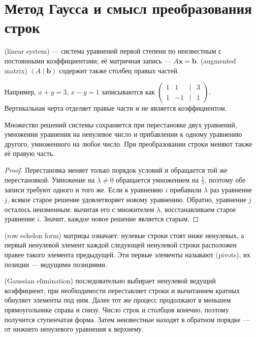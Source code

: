\section{Метод Гаусса и смысл преобразования строк}
\begin{definition}
 (linear system) — система уравнений первой степени по неизвестным с постоянными коэффициентами; её матричная запись — \(A\symbf x=\symbf b\).  (augmented matrix) \((A\mid\symbf b)\) содержит также столбец правых частей.
\end{definition}
Например, \(x+y=3\), \(x-y=1\) записываются как \(\begin{pmatrix}1&1&\mid&3\\1&-1&\mid&1\end{pmatrix}\). Вертикальная черта отделяет правые части и не является коэффициентом.

\begin{theorem}\label{thm:legacy-c18-2}
Множество решений системы сохраняется при перестановке двух уравнений, умножении уравнения на ненулевое число и прибавлении к одному уравнению другого, умноженного на любое число. При преобразовании строки меняют также её правую часть.
\end{theorem}
\begin{proof}
Перестановка меняет только порядок условий и обращается той же перестановкой. Умножение на \(\lambda\ne0\) обращается умножением на \(\frac1\lambda\), поэтому обе записи требуют одного и того же. Если к уравнению \(i\) прибавили \(\lambda\) раз уравнение \(j\), всякое старое решение удовлетворяет новому уравнению. Обратно, уравнение \(j\) осталось неизменным: вычитая его с множителем \(\lambda\), восстанавливаем старое уравнение \(i\). Значит, каждое новое решение является старым.
\end{proof}
\begin{definition}
 (row echelon form) матрицы означает: нулевые строки стоят ниже ненулевых, а первый ненулевой элемент каждой следующей ненулевой строки расположен правее такого элемента предыдущей. Эти первые элементы называют  (pivots), их позиции — ведущими позициями.
\end{definition}
 (Gaussian elimination) последовательно выбирает ненулевой ведущий коэффициент, при необходимости переставляет строки и вычитанием кратных обнуляет элементы под ним. Далее тот же процесс продолжают в меньшем прямоугольнике справа и снизу. Число строк и столбцов конечно, поэтому получится ступенчатая форма. Затем неизвестные находят в обратном порядке — от нижнего ненулевого уравнения к верхнему.

